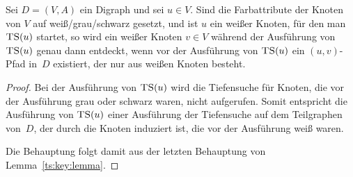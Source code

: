 \begin{kor}\label{kor:weisse:pfade} 
	Sei $D=(V,A)$ ein Digraph und sei $u \in V$.
	Sind die Farbattribute der Knoten von $V$ auf weiß/grau/schwarz gesetzt, und ist $u$ ein weißer Knoten, für den man $\mathop{\text{\textsc{TS}}}(u)$ startet, so wird ein weißer Knoten $v \in V$ während der Ausführung von $\mathop{\text{\textsc{TS}}}(u)$ genau dann entdeckt, wenn vor der Ausführung von $\mathop{\text{\textsc{TS}}}(u)$ ein $(u,v)$-Pfad in~$D$ existiert, der nur aus weißen Knoten besteht. 
\end{kor} 
\begin{proof}
	Bei der Ausführung von $\mathop{\text{\textsc{TS}}}(u)$ wird die Tiefensuche für Knoten, die vor der Ausführung grau oder schwarz waren, nicht aufgerufen. Somit entspricht die Ausführung von $\mathop{\text{\textsc{TS}}}(u)$ einer Ausführung der Tiefensuche auf dem Teilgraphen von~$D$, der durch die Knoten induziert ist, die vor der Ausführung weiß waren.
	
	Die Behauptung folgt damit aus der letzten Behauptung von Lemma~\ref{ts:key:lemma}. 
\end{proof} 


